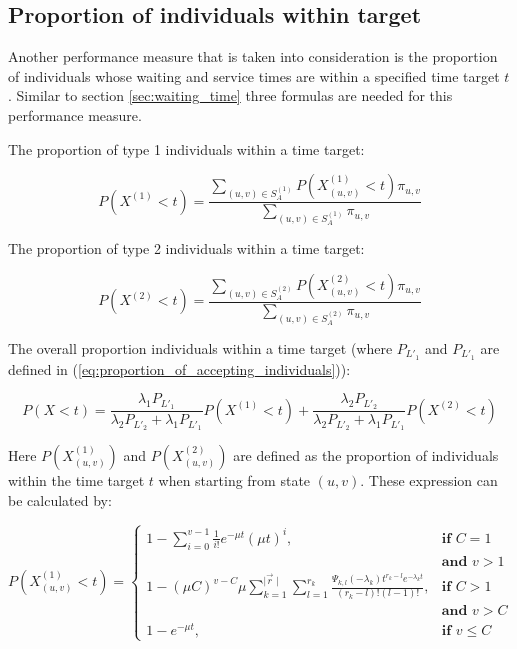 \subsection{Proportion of individuals within target}\label{sec:proportion_within_target}

Another performance measure that is taken into consideration is the proportion 
of individuals whose waiting and service times are within a specified 
time target \(t\).
Similar to section \ref{sec:waiting_time} three formulas are needed for this 
performance measure.

The proportion of type 1 individuals within a time target:

\begin{equation}\label{eq:proportion_within_target_type_1}
    P(X^{(1)} < t) = \frac{\sum_{(u,v) \in S_A^{(1)}} P(X_{(u,v)}^{(1)} < t) 
    \pi_{u,v} }{\sum_{(u,v) \in S_A^{(1)}} \pi_{u,v}}
\end{equation}

The proportion of type 2 individuals within a time target:

\begin{equation}\label{eq:proportion_within_target_type_2}
    P(X^{(2)} < t) = \frac{\sum_{(u,v) \in S_A^{(2)}} P(X_{(u,v)}^{(2)} < t) 
    \pi_{u,v} }{\sum_{(u,v) \in S_A^{(2)}} \pi_{u,v}}
\end{equation}

The overall proportion individuals within a time target (where \(P_{L'_1}\) and 
\(P_{L'_1}\) are defined in (\ref{eq:proportion_of_accepting_individuals})):

\begin{equation}\label{eq:overall_proportion_within_target}
    P(X < t) = \frac{\lambda_1 P_{L'_1}}{\lambda_2 P_{L'_2}+\lambda_1 P_{L'_1}} 
    P(X^{(1)} < t) + \frac{\lambda_2 P_{L'_2}}{\lambda_2 P_{L'_2} + 
    \lambda_1 P_{L'_1}} P(X^{(2)} < t) 
\end{equation}

Here \(P(X_{(u,v)}^{(1)})\) and \(P(X_{(u,v)}^{(2)})\) are defined as the
proportion of individuals within the time target \(t\) when starting from state 
\((u,v)\).
These expression can be calculated by:

\begin{equation}\label{eq:proportion_within_target_type_1_from_state}
    P(X_{(u,v)}^{(1)} < t) = 
    \begin{cases}
        1 - \sum_{i=0}^{v-1} \frac{1}{i!} e^{-\mu t} (\mu t)^i, 
            & \textbf{if } C = 1 \\
            & \textbf{and } v>1 \\
        1 - (\mu C)^{v-C} \mu  
            \sum_{k=1}^{\mid \vec{r} \mid} \sum_{l=1}^{r_k}
            \frac{\Psi_{k,l}(-\lambda_k)t^{r_k - l} 
            e^{-\lambda_k t}}{(r_k - l)! (l - 1)!},
            & \textbf{if } C > 1 \\
            & \textbf{and } v > C \\
        1 - e^{-\mu t},  & \textbf{if } v \leq C
    \end{cases}
\end{equation}

